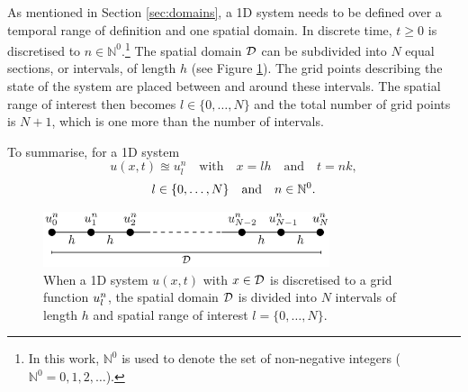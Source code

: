 As mentioned in Section \ref{sec:domains}, a 1D system needs to be defined over a temporal range of definition and one spatial domain.
In discrete time, $t \geq 0$ is discretised to $n \in \mathbb{N}^0$.\footnote{In this work, $\mathbb{N}^0$ is used to denote the set of non-negative integers ($\mathbb{N}^0 = 0, 1, 2, 
\hdots$).} 
The spatial domain $\mathcal{D}$ can be subdivided into $N$ equal sections, or intervals, of length $h$ (see Figure \ref{fig:gridExp}). The grid points describing the state of the system are placed between and around these intervals. The spatial range of interest then becomes $l\in \{0, \hdots, N\}$ and the total number of grid points is $N+1$, which is one more than the number of intervals.




 To summarise, for a 1D system
\begin{equation*}
    u(x,t) \approxeq u_l^n \quad \text{with} \quad x=lh \quad \text{and} \quad t = nk,
\end{equation*}
\begin{equation*}
    l\in\{0, \hdots, N\}\quad \text{and} \quad n \in \mathbb{N}^0.
\end{equation*}

\begin{figure}[h]
    \centering
    \includegraphics[width=0.75\textwidth]{figures/fdtd/gridExplanation2.pdf}
    \caption{When a 1D system $u(x,t)$ with $x\in \mathcal{D}$ is discretised to a grid function $u_l^n$, the spatial domain $\mathcal{D}$ is divided into $N$ intervals of length $h$ and spatial range of interest $l=\{0, \hdots, N\}$.\label{fig:gridExp}}
\end{figure}


